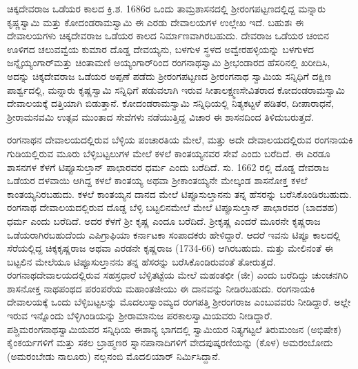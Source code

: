 ಚಿಕ್ಕದೇವರಾಜ ಒಡೆಯರ ಕಾಲದ ಕ್ರಿ.ಶ. 1686ರ ಒಂದು ತಾಮ್ರಶಾಸನದಲ್ಲಿ ಶ‍್ರೀರಂಗಪಟ್ಟಣದಲ್ಲಿದ್ದ ಮನ್ನಾರು ಕೃಷ್ಣಸ್ವಾಮಿ ಮತ್ತು ಕೋದಂಡರಾಮಸ್ವಾಮಿ ಈ ಎರಡು ದೇವಾಲಯಗಳ ಉಲ್ಲೇಖ ಇದೆ. ಬಹುಶಃ ಈ ದೇವಾಲಯಗಳು ಚಿಕ್ಕದೇವರಾಜ ಒಡೆಯರ ಕಾಲದ ನಿರ್ಮಾಣವಾಗಿರಬಹುದು. ದೇವರಾಜ ಒಡೆಯರ ಚಂಬಿನ ಊಳಿಗದ ಚಲುವವ್ವೆಯ ಕುಮಾರ ದೊಡ್ಡ ದೇವಯ್ಯನು, ಬಳಗುಳ ಸ್ಥಳದ ಅವ್ವೇರಹಳ್ಳಿಯನ್ನು ಬಳಗುಳದ ಜನ್ನೈಯ್ಯಂಗಾರ್​ ಮತ್ತು ಚಿಂತಾಮಣಿ ಅಯ್ಯಂಗಾರ್​ರಿಂದ ರಂಗನಾಥಸ್ವಾಮಿ ಶ‍್ರೀಭಂಡಾರದ ಹೆಸರಿನಲ್ಲಿ ಖರೀದಿಸಿ, ಅದನ್ನು ಚಿಕ್ಕದೇವರಾಜ ಒಡೆಯರ ಅಪ್ಪಣೆ ಪಡೆದು ಶ‍್ರೀರಂಗಪಟ್ಟಣದ ಶ‍್ರೀರಂಗನಾಥ ಸ್ವಾಮಿಯ ಸನ್ನಿಧಿಗೆ ದಕ್ಷಿಣ ಪಾರ್ಶ್ವದಲ್ಲಿ, ಮನ್ನಾರು ಕೃಷ್ಣಸ್ವಾಮಿ ಸನ್ನಿಧಿಗೆ ಪಡುವಲಾಗಿ ಇರುವ ಸೀತಾಲಕ್ಷ್ಮಣಸೇವಿತರಾದ ಕೋದಂಡರಾಮಸ್ವಾಮಿ ದೇವಾಲಯಕ್ಕೆ ದತ್ತಿಯಾಗಿ ಬಿಡುತ್ತಾನೆ. ಕೋದಂಡರಾಮಸ್ವಾಮಿ ಸನ್ನಿಧಿಯಲ್ಲಿ ನಿತ್ಯಕಟ್ಟಳೆ ಪಡಿತರ, ದೀಪಾರಾಧನೆ, ಶ‍್ರೀರಾಮನವಮಿ ಉತ್ಸವ ಮುಂತಾದ ಸೇವೆಗಳು ನಡೆಯುತ್ತಿದ್ದ ವಿಚಾರ ಈ ಶಾಸನದಿಂದ ತಿಳಿದುಬರುತ್ತದೆ.

ರಂಗನಾಥನ ದೇವಾಲಯದಲ್ಲಿರುವ ಬೆಳ್ಳಿಯ ಪಂಚಾರತಿಯ ಮೇಲೆ, ಮತ್ತು ಅದೇ ದೇವಾಲಯದಲ್ಲಿರುವ ರಂಗನಾಯಕಿ ಗುಡಿಯಲ್ಲಿರುವ ಮೂರು ಬೆಳ್ಳಿಬಟ್ಟಲುಗಳ ಮೇಲೆ ಕಳಲೆ ಕಾಂತಯ್ಯನವರ ಸೇವೆ ಎಂದು ಬರೆದಿದೆ. ಈ ಎರಡೂ ಶಾಸನಗಳ ಕೆಳಗೆ ಟಿಪ್ಪೂಸುಲ್ತಾನ್​ ಪಾಛಾರವರ ಧರ್ಮ ಎಂದು ಬರೆದಿದೆ. ಸು. 1662 ರಲ್ಲಿ ದೊಡ್ಡ ದೇವರಾಜ ಒಡೆಯರ ದಳವಾಯಿ ಆಗಿದ್ದ ಕಳಲೆ ಕಾಂತಯ್ಯ ಅಥವಾ ಶ‍್ರೀಕಾಂತಯ್ಯನೇ ಮೇಲ್ಕಂಡ ಶಾಸನೋಕ್ತ ಕಳಲೆ ಕಾಂತಯ್ಯನಿರಬಹುದು. ಕಳಲೆ ಕಾಂತಯ್ಯನ ದಾನದ ಮೇಲೆ ಟಿಪ್ಪೂಸುಲ್ತಾನನು ತನ್ನ ಹೆಸರನ್ನು ಬರೆಸಿಕೊಂಡಿರಬಹುದು. ರಂಗನಾಥ ದೇವಾಲಯದಲ್ಲಿರುವ ದೊಡ್ಡ ಬೆಳ್ಳಿ ಬಟ್ಟಲಿನಮೇಲೆ ಮೇಲೆ ಟಿಪ್ಪೂಸುಲ್ತಾನ್​ ಪಾಛಾರವರ (ಬಾದಶಹ) ಧರ್ಮ ಎಂದು ಬರೆದಿದೆ. ಅದರ ಕೆಳಗೆ ಶ‍್ರೀ ಕೃಷ್ಣ ಎಂದೂ ಬರೆದಿದೆ. ಶ‍್ರೀಕೃಷ್ಣ ಎಂದರೆ ಮೂರನೇ ಕೃಷ್ಣರಾಜ ಒಡೆಯರಾಗಿರಬಹುದೆಂದು ಎಪಿಗ್ರಾಫಿಯಾ ಕರ್ನಾಟಕಾ ಸಂಪಾದಕರು ಹೇಳಿದ್ದಾರೆ. ಆದರೆ ಇವನು ಟಿಪ್ಪೂ ಕಾಲದಲ್ಲಿ ಸೆರೆಯಲ್ಲಿದ್ದ ಚಿಕ್ಕಕೃಷ್ಣರಾಜ ಅಥವಾ ಎರಡನೇ ಕೃಷ್ಣರಾಜ (1734-66) ಆಗಿರಬಹುದು. ಮತ್ತು ಮೇಲಿನಂತೆ ಈ ಬಟ್ಟಲಿನ ಮೇಲೆಯೂ ಟಿಪ್ಪೂಸುಲ್ತಾನನು ತನ್ನ ಹೆಸರನ್ನು ಬರೆಸಿಕೊಂಡಿರುವಂತೆ ತೋರುತ್ತದೆ. ರಂಗನಾಥದೇವಾಲಯದಲ್ಲಿರುವ ಸಹಸ್ರಧಾರೆ ಬೆಳ್ಳಿತಟ್ಟೆಯ ಮೇಲೆ ಮಹಂತಛೀ (ಜೀ) ಎಂದು ಬರೆದಿದ್ದು ಚುಂಚನಗಿರಿ ಶಾಸನೋಕ್ತ ನಾಥಪಂಥದ ಪರಂಪರೆಯ ಮಹಾಂತಜೀಯು ಈ ದಾನವನ್ನು ನೀಡಿರಬಹುದು. ರಂಗನಾಯಕಿ ದೇವಾಲಯಕ್ಕೆ ಒಂದು ಬೆಳ್ಳಿಬಟ್ಟಲನ್ನು ಮೊದಲು\-ಸ್ವಾಂಮ್ಯದ ರಂಗಪತ್ತಿ ಶ‍್ರೀರಂಗರಾಜ ಎಂಬುವವರು ನೀಡಿದ್ದಾರೆ. ಅಲ್ಲೇ ಇರುವ ಇನ್ನೊಂದು ಬೆಳ್ಳಿಗಿಂಡಿಯನ್ನು ಶ‍್ರೀರಾಮಾನುಜ ಪರಕಾಲಸ್ವಾಮಿಯವರು ನೀಡಿದ್ದಾರೆ. ಪಶ್ಚಿಮರಂಗನಾಥಸ್ವಾಮಿಯವರ ಸನ್ನಿಧಿಯ ಈಶಾನ್ಯ ಭಾಗದಲ್ಲಿ ಸ್ವಾಮಿಯರ ನಿತ್ಯಗಟ್ಟಲೆ ತಿರುಮಂಜನ (ಅಭಿಷೇಕ) ಕೈಂಕರ್ಯಗಳಿಗೆ ಮತ್ತು ಸಕಲ ಬ್ರಾಹ್ಮಣರ ಸ್ನಾನಪಾನಾದಿಗಳಿಗೆ ವೇದಪುಷ್ಕರಣಿಯನ್ನು (ಕೊಳ) ಅಮರಂಬೋದು (ಅಮರಂಬೇಡು ನಾಲೂರು) ನಲ್ಲನಂಬಿ ಮೊದಲಿಯಾರ್​ ನಿರ್ಮಿಸಿದ್ದಾನೆ.

